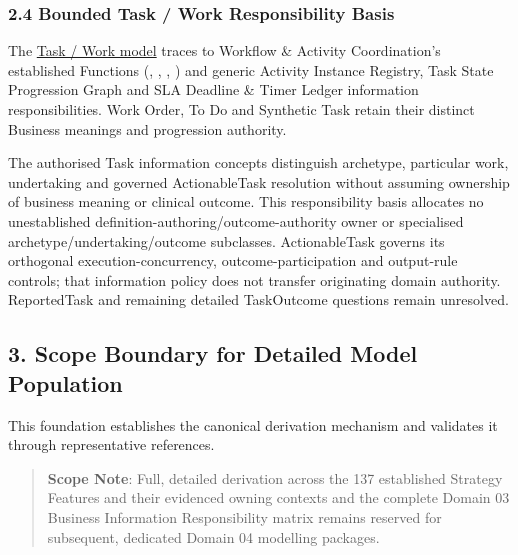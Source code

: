 \subsubsection*{2.4 Bounded Task /\allowbreak{} Work Responsibility Basis}
\label{rad:traceability:135}

The \href{https://github.com/fhirfactory/harmonia/blob/98410db60155198a75f74c79d98060070209faa1/docs/markdown/04-information-architecture/information-families/task-work.md\#4-relationship-to-domain03-business-work-classifications}{Task /\allowbreak{} Work model} traces to Workflow \& Activity Coordination's established Functions (\texttt{}, \texttt{}, \texttt{}, \texttt{}) and generic Activity Instance Registry, Task State Progression Graph and SLA Deadline \& Timer Ledger information responsibilities. Work Order, To Do and Synthetic Task retain their distinct Business meanings and progression authority.

\label{rad:traceability:143}

The authorised Task information concepts distinguish archetype, particular work, undertaking and governed ActionableTask resolution without assuming ownership of business meaning or clinical outcome. This responsibility basis allocates no unestablished definition-authoring/\allowbreak{}outcome-authority owner or specialised archetype/\allowbreak{}undertaking/\allowbreak{}outcome subclasses. ActionableTask governs its orthogonal execution-concurrency, outcome-participation and output-rule controls; that information policy does not transfer originating domain authority. ReportedTask and remaining detailed TaskOutcome questions remain unresolved.

\label{rad:traceability:152}

\par\smallskip
{}\label{rad:traceability:154}
\subsection*{3. Scope Boundary for Detailed Model Population}
\label{rad:traceability:156}

This foundation establishes the canonical derivation mechanism and validates it through representative references.

\label{rad:traceability:158}

\begin{quote}

\textbf{Scope Note}: Full, detailed derivation across the 137 established Strategy Features and their evidenced owning contexts and the complete Domain 03 Business Information Responsibility matrix remains reserved for subsequent, dedicated Domain 04 modelling packages.


\end{quote}

